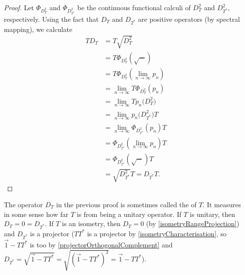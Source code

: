 \begin{proof}
Let $\Phi_{D_T^2}$ and $\Phi_{D_{T^*}^2}$ be the continuous functional calculi of $D_T^2$ and $D_{T^*}^2$, respectively. Using the fact that $D_T$ and $D_{T^*}$ are positive operators (by spectral mapping), we calculate
\begin{align*}
TD_{T} &= T\sqrt{D_T^2} \\
&= T\Phi_{D_T^2}(\sqrt{-}) \\
&= T\Phi_{D_T^2}(\lim_{n\to \infty}p_n) \\
&= \lim_{n\to \infty}T\Phi_{D_T^2}(p_n) \\
&= \lim_{n\to \infty}Tp_n\big(D_T^2\big) \\
&= \lim_{n\to \infty}p_n\big(D_{T^*}^2\big)T \\
&= \lim_{n\to \infty}\Phi_{D_{T^*}^2}(p_n)T \\
&= \Phi_{D_{T^*}^2}(\lim_{n\to \infty} p_n)T \\
&= \Phi_{D_{T^*}^2}(\sqrt{-})T \\
&= \sqrt{D_{T^*}^2}T = D_{T^*}T.
\end{align*}
\end{proof}
The operator $D_T$ in the previous proof is sometimes called the  of $T$. It measures in some sense how far $T$ is from being a unitary operator. If $T$ is unitary, then $D_T = 0 = D_{T^*}$. If $T$ is an isometry, then $D_T = 0$ (by \ref{isometryRangeProjection}) and $D_{T^*}$ is a projector ($TT^*$ is a projector by \ref{isometryCharacterisation}, so $\vec{1} - TT^*$ is too by \ref{projectorOrthogonalComplement} and $D_{T^*} = \sqrt{\vec{1}-TT^*} = \sqrt{(\vec{1}-TT^*)^2} = \vec{1}-TT^*$).

